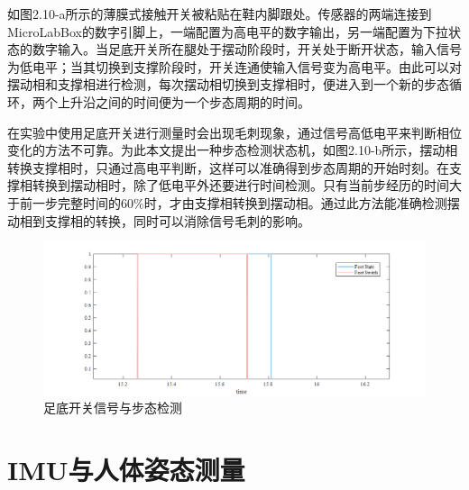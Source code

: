 如图2.10-a所示的薄膜式接触开关被粘贴在鞋内脚跟处。传感器的两端连接到MicroLabBox的数字引脚上，一端配置为高电平的数字输出，另一端配置为下拉状态的数字输入。当足底开关所在腿处于摆动阶段时，开关处于断开状态，输入信号为低电平；当其切换到支撑阶段时，开关连通使输入信号变为高电平。由此可以对摆动相和支撑相进行检测，每次摆动相切换到支撑相时，便进入到一个新的步态循环，两个上升沿之间的时间便为一个步态周期的时间。

在实验中使用足底开关进行测量时会出现毛刺现象，通过信号高低电平来判断相位变化的方法不可靠。为此本文提出一种步态检测状态机，如图2.10-b所示，摆动相转换支撑相时，只通过高电平判断，这样可以准确得到步态周期的开始时刻。在支撑相转换到摆动相时，除了低电平外还要进行时间检测。只有当前步经历的时间大于前一步完整时间的60\%时，才由支撑相转换到摆动相。通过此方法能准确检测摆动相到支撑相的转换，同时可以消除信号毛刺的影响。
\begin{figure}[htb]
    \includegraphics[width=16cm]{fig/f33.png}
    \caption{足底开关信号与步态检测}
    \label{fig:mark}
\end{figure}

\section{IMU与人体姿态测量}
